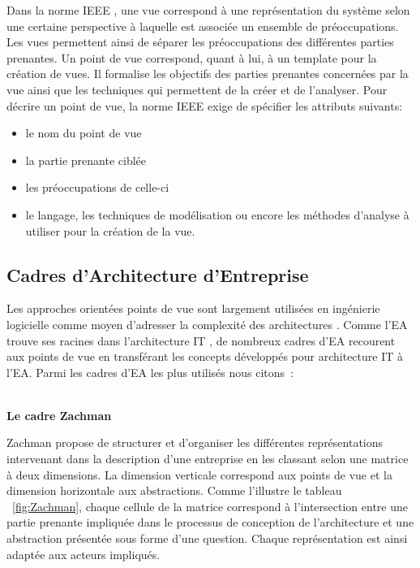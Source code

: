 Dans la norme IEEE \cite{hilliard2000ieee}, une vue correspond à une 
représentation du système selon une certaine perspective à laquelle est associée 
un ensemble de préoccupations. Les vues permettent ainsi de séparer les 
préoccupations des différentes parties prenantes. Un point de vue correspond, 
quant à lui, à un template pour la création de 
vues. Il formalise les objectifs des parties prenantes concernées par la vue 
ainsi que les techniques qui permettent de la créer et de l'analyser. Pour 
décrire un point de vue, la norme IEEE \cite{hilliard2000ieee} exige de 
spécifier les attributs suivants:
\begin{itemize}
\item le nom du point de vue
\item la partie prenante ciblée
\item les préoccupations de celle-ci
\item le langage, les techniques de modélisation ou encore les méthodes 
d'analyse à utiliser pour la création de la vue. 
\end{itemize}

	\subsection{Cadres d'Architecture d'Entreprise}

Les approches orientées points de vue sont largement utilisées en ingénierie 
logicielle comme moyen d'adresser la complexité des architectures 
\cite{steen2004supporting}. Comme l'EA trouve ses racines dans 
l'architecture IT \cite{winter2008enterprise}, de nombreux cadres d'EA 
recourent aux points de vue en transférant les concepts développés pour 
architecture IT à l'EA. Parmi les cadres d'EA les plus utilisés nous 
citons~:
\\\

\textbf{Le cadre Zachman}

Zachman \cite{zachman1987framework} propose de structurer et d'organiser les 
différentes représentations intervenant dans la description d'une entreprise en 
les classant selon une matrice à deux dimensions. La dimension verticale 
correspond aux points de vue et la dimension horizontale aux abstractions. Comme 
l'illustre le tableau ~\ref{fig:Zachman}, chaque cellule de la matrice 
correspond à l'intersection entre une partie prenante impliquée dans le 
processus de conception de l'architecture et une abstraction présentée sous 
forme d'une question. Chaque représentation est ainsi adaptée aux acteurs 
impliqués. 

